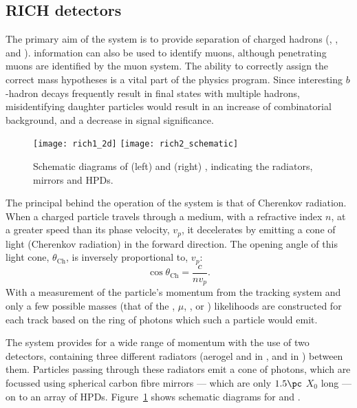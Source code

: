 \subsection{RICH detectors}

The primary aim of the \lhcb \rich system is to provide \pid separation of charged hadrons (\pion,
\kaon, and \proton).
\rich information can also be used to identify muons, although penetrating muons are identified by
the muon system.
The ability to correctly assign the correct mass hypotheses is a vital part of the \lhcb physics
program.
Since interesting $b$-hadron decays frequently result in final states with multiple hadrons,
misidentifying daughter particles would result in an increase of combinatorial background, and
a decrease in signal significance.

\begin{figure}
  \begin{center}
    \texttt{[image: rich1\_2d]}
    \texttt{[image: rich2\_schematic]}
    \caption[Diagmra of the LHCb RICH detectors]
    {\small
      Schematic diagrams of (left) \richone and (right) \richtwo, indicating the radiators,
      mirrors and HPDs.
    }
    \label{fig:lhcb:rich}
  \end{center}
\end{figure}

The principal behind the operation of the \rich system is that of Cherenkov radiation.
When a charged particle travels through a medium, with a refractive index $n$, at a greater speed
than its phase velocity, $v_p$, it decelerates by emitting a cone of light (Cherenkov radiation) in
the forward direction.
The opening angle of this light cone, $\theta_\mathrm{Ch}$, is inversely proportional to, $v_p$:
\begin{equation}
  \cos\theta_\mathrm{Ch}=\frac{c}{nv_p}.
\end{equation}
With a measurement of the particle's momentum from the tracking system and only a few possible
masses (that of the \electron, $\mu$, \pion, \kaon or \proton) likelihoods are constructed for each
track based on the ring of photons which such a particle would emit.

The \lhcb \rich system provides \pid for a wide range of momentum with the use of two \rich
detectors, containing three different radiators (aerogel and \cfourften in
\richone, and \cffour in \richtwo) between them.
Particles passing through these radiators emit a cone of photons, which are focussed using
spherical carbon fibre mirrors --- which are only $1.5\pc$ $X_0$ long --- on to an array of
\glspl{HPD}.
Figure~\ref{fig:lhcb:rich} shows schematic diagrams for \richone and \richtwo.

